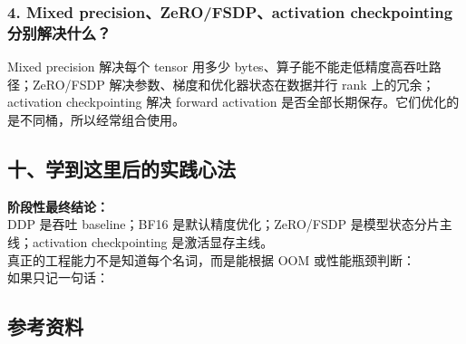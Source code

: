 \subsubsection*{4. Mixed precision、ZeRO/FSDP、activation checkpointing 分别解决什么？}

Mixed precision 解决每个 tensor 用多少 bytes、算子能不能走低精度高吞吐路径；ZeRO/FSDP 解决参数、梯度和优化器状态在数据并行 rank 上的冗余；activation checkpointing 解决 forward activation 是否全部长期保存。它们优化的是不同桶，所以经常组合使用。

\subsection{十、学到这里后的实践心法}

\begin{summarybox}
\textbf{阶段性最终结论：}\\
DDP 是吞吐 baseline；BF16 是默认精度优化；ZeRO/FSDP 是模型状态分片主线；activation checkpointing 是激活显存主线。\\
真正的工程能力不是知道每个名词，而是能根据 OOM 或性能瓶颈判断：\\
如果只记一句话：
\end{summarybox}

\subsection{参考资料}

